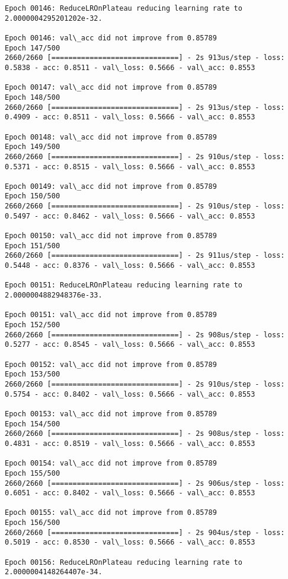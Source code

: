 \documentclass[11pt]{article}
\begin{document}
\begin{Verbatim}[commandchars=\\\{\}]
Epoch 00146: ReduceLROnPlateau reducing learning rate to 2.0000004295201202e-32.

Epoch 00146: val\_acc did not improve from 0.85789
Epoch 147/500
2660/2660 [==============================] - 2s 913us/step - loss: 0.5838 - acc: 0.8511 - val\_loss: 0.5666 - val\_acc: 0.8553

Epoch 00147: val\_acc did not improve from 0.85789
Epoch 148/500
2660/2660 [==============================] - 2s 913us/step - loss: 0.4909 - acc: 0.8511 - val\_loss: 0.5666 - val\_acc: 0.8553

Epoch 00148: val\_acc did not improve from 0.85789
Epoch 149/500
2660/2660 [==============================] - 2s 910us/step - loss: 0.5371 - acc: 0.8515 - val\_loss: 0.5666 - val\_acc: 0.8553

Epoch 00149: val\_acc did not improve from 0.85789
Epoch 150/500
2660/2660 [==============================] - 2s 910us/step - loss: 0.5497 - acc: 0.8462 - val\_loss: 0.5666 - val\_acc: 0.8553

Epoch 00150: val\_acc did not improve from 0.85789
Epoch 151/500
2660/2660 [==============================] - 2s 911us/step - loss: 0.5448 - acc: 0.8376 - val\_loss: 0.5666 - val\_acc: 0.8553

Epoch 00151: ReduceLROnPlateau reducing learning rate to 2.0000004882948376e-33.

Epoch 00151: val\_acc did not improve from 0.85789
Epoch 152/500
2660/2660 [==============================] - 2s 908us/step - loss: 0.5277 - acc: 0.8545 - val\_loss: 0.5666 - val\_acc: 0.8553

Epoch 00152: val\_acc did not improve from 0.85789
Epoch 153/500
2660/2660 [==============================] - 2s 910us/step - loss: 0.5754 - acc: 0.8402 - val\_loss: 0.5666 - val\_acc: 0.8553

Epoch 00153: val\_acc did not improve from 0.85789
Epoch 154/500
2660/2660 [==============================] - 2s 908us/step - loss: 0.4831 - acc: 0.8519 - val\_loss: 0.5666 - val\_acc: 0.8553

Epoch 00154: val\_acc did not improve from 0.85789
Epoch 155/500
2660/2660 [==============================] - 2s 906us/step - loss: 0.6051 - acc: 0.8402 - val\_loss: 0.5666 - val\_acc: 0.8553

Epoch 00155: val\_acc did not improve from 0.85789
Epoch 156/500
2660/2660 [==============================] - 2s 904us/step - loss: 0.5019 - acc: 0.8530 - val\_loss: 0.5666 - val\_acc: 0.8553

Epoch 00156: ReduceLROnPlateau reducing learning rate to 2.0000004148264407e-34.


\end{Verbatim}
\end{document}
